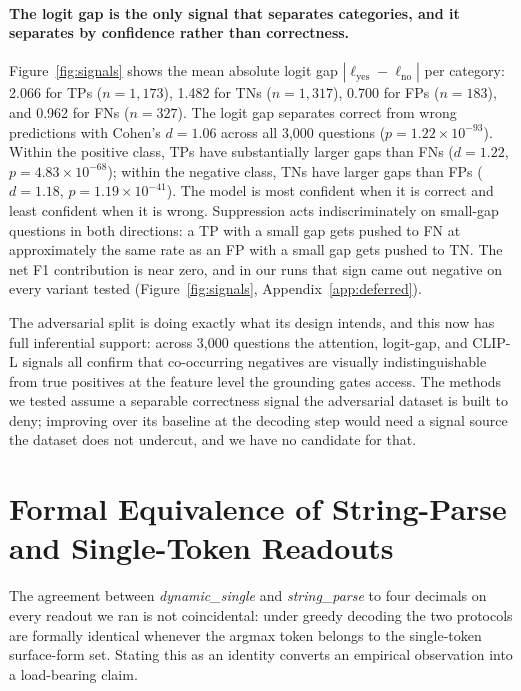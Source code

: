 \documentclass{article}
\begin{document}
\paragraph{The logit gap is the only signal that separates categories,
and it separates by confidence rather than correctness.}
Figure~\ref{fig:signals} shows the mean absolute logit gap
$|\ell_{\text{yes}} - \ell_{\text{no}}|$ per category: 2.066 for TPs
($n{=}1{,}173$), 1.482 for TNs ($n{=}1{,}317$), 0.700 for FPs
($n{=}183$), and 0.962 for FNs ($n{=}327$). The logit gap separates
correct from wrong predictions with Cohen's $d=1.06$ across all 3,000
questions ($p=1.22 \times 10^{-93}$). Within the positive class, TPs
have substantially larger gaps than FNs ($d=1.22$,
$p=4.83 \times 10^{-68}$); within the negative class, TNs have larger
gaps than FPs ($d=1.18$, $p=1.19 \times 10^{-41}$). The model is most
confident when it is correct and least confident when it is wrong.
Suppression acts indiscriminately on small-gap questions in both
directions: a TP with a small gap gets pushed to FN at approximately
the same rate as an FP with a small gap gets pushed to TN. The net F1
contribution is near zero, and in our runs that sign came out negative
on every variant tested (Figure~\ref{fig:signals},
Appendix~\ref{app:deferred}).

The adversarial split is doing exactly what its design intends, and this
now has full inferential support: across 3,000 questions the attention,
logit-gap, and CLIP-L signals all confirm that co-occurring negatives
are visually indistinguishable from true positives at the feature level
the grounding gates access. The methods we tested assume a separable
correctness signal the adversarial dataset is built to deny; improving
over its baseline at the decoding step would need a signal source the
dataset does not undercut, and we have no candidate for that.

\section{Formal Equivalence of String-Parse and Single-Token Readouts}
\label{sec:equiv}

The agreement between \emph{dynamic\_single} and \emph{string\_parse} to
four decimals on every readout we ran is not coincidental: under greedy
decoding the two protocols are formally identical whenever the argmax
token belongs to the single-token surface-form set. Stating this as an
identity converts an empirical observation into a load-bearing claim.
\end{document}
